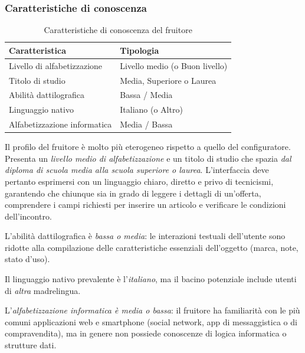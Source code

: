 \subsubsection{Caratteristiche di conoscenza}
\begin{table}[H]
    \centering
    \begin{tabular}{@{}>{\raggedright\arraybackslash}p{6cm}>{\raggedright\arraybackslash}p{6cm}@{}}
        \toprule
        \textbf{Caratteristica}      & \textbf{Tipologia}             \\ \midrule
        Livello di alfabetizzazione  & Livello medio (o Buon livello) \\
        Titolo di studio             & Media, Superiore o Laurea      \\
        Abilità dattilografica       & Bassa / Media                  \\
        Linguaggio nativo            & Italiano (o Altro)             \\
        Alfabetizzazione informatica & Media / Bassa                  \\ \bottomrule
    \end{tabular}
    \caption{Caratteristiche di conoscenza del fruitore}
\end{table}

Il profilo del fruitore è molto più eterogeneo rispetto a quello del configuratore. Presenta un \emph{livello medio di alfabetizzazione} e un titolo di studio che spazia \emph{dal diploma di scuola media alla scuola superiore o laurea}. L'interfaccia deve pertanto esprimersi con un linguaggio chiaro, diretto e privo di tecnicismi, garantendo che chiunque sia in grado di leggere i dettagli di un'offerta, comprendere i campi richiesti per inserire un articolo e verificare le condizioni dell'incontro.

L'abilità dattilografica è \emph{bassa o media}: le interazioni testuali dell'utente sono ridotte alla compilazione delle caratteristiche essenziali dell'oggetto (marca, note, stato d'uso).

Il linguaggio nativo prevalente è l'\emph{italiano}, ma il bacino potenziale include utenti di \emph{altra} madrelingua.

L'\emph{alfabetizzazione informatica è media o bassa}: il fruitore ha familiarità con le più comuni applicazioni web e smartphone (social network, app di messaggistica o di compravendita), ma in genere non possiede conoscenze di logica informatica o strutture dati.

